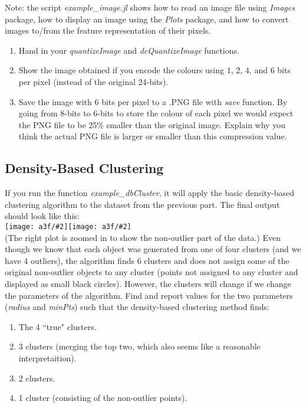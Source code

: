 \documentclass{article}
\def\blu#1{{\color{blu}#1}}
\newcommand{\fig}[2]{\texttt{[image: a3f/\#2]}}
\def\enum#1{\begin{enumerate}#1\end{enumerate}}
\begin{document}
Note: the script \emph{example\_image.jl} shows how to read an image file using \emph{Images} package, how to display an image using the \emph{Plots} package, and how to convert images to/from the feature representation of their pixels.

\blu{\enum{
\item Hand in your \emph{quantizeImage} and \emph{deQuantizeImage} functions.
\pagebreak
\item Show the image obtained if you encode the colours using $1$, $2$, $4$, and $6$ bits per pixel (instead of the original 24-bits).
\item Save the image with 6 bits per pixel to a .PNG file with \emph{save} function. By going from 8-bits to 6-bits to store the colour of each pixel we would expect the PNG file to be 25\% smaller than the original image. Explain why you think the actual PNG file is larger or smaller than this compression value.
}
}


\pagebreak

\subsection{Density-Based Clustering}

If you run the function \emph{example\_dbCluster}, it will apply the basic density-based clustering algorithm to the dataset from the previous part. The final output should look like this:\\
\fig{.49}{density}\fig{.49}{density2}\\
(The right plot is zoomed in to show the non-outlier part of the data.)
Even though we know that each object was generated from one of four clusters (and we have 4 outliers), the algorithm finds 6 clusters and does not assign some of the original non-outlier objects to any cluster (points not assigned to any cluster and displayed as small black circles). However, the clusters will change if we change the parameters of the algorithm. Find and report values for the two parameters (\emph{radius} and \emph{minPts}) such that the density-based clustering method finds:
\blu{\enum{
\item The 4 ``true" clusters.
\item 3 clusters (merging the top two, which also seems like a reasonable interpretaition).
\item 2 clusters.
\item 1 cluster (consisting of the non-outlier points).
}}


\pagebreak
\end{document}
